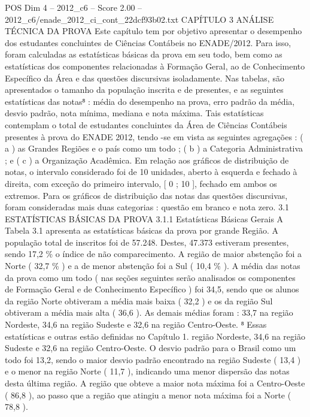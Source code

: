 \begin{textsample}{POS Dim 4 – 2012\_c6 – Score 2.00 – 2012\_c6/enade\_2012\_ci\_cont\_22dcf93b02.txt}  \label{ex:f4_pos_123}
CAPÍTULO 3 ANÁLISE TÉCNICA DA PROVA Este capítulo tem por objetivo apresentar o desempenho dos estudantes concluintes de Ciências Contábeis no ENADE/2012.
Para isso, foram calculadas as estatísticas básicas da prova em seu todo, bem como as estatísticas dos componentes relacionadas à Formação Geral, ao de Conhecimento Específico da Área e das questões discursivas isoladamente.
Nas tabelas, são apresentados o tamanho da população inscrita e de presentes, e as seguintes estatísticas das notas⁸ : média do desempenho na prova, erro padrão da média, desvio padrão, nota mínima, mediana e nota máxima.
Tais estatísticas contemplam o total de estudantes concluintes da Área de Ciências Contábeis presentes à prova do ENADE 2012, tendo -se em vista as seguintes agregações : ( a ) as Grandes Regiões e o país como um todo ; ( b ) a Categoria Administrativa ; e ( c ) a Organização Acadêmica.
Em relação aos gráficos de distribuição de notas, o intervalo considerado foi de 10 unidades, aberto à esquerda e fechado à direita, com exceção do primeiro intervalo, [ 0 ; 10 ], fechado em ambos os extremos.
Para os gráficos de distribuição das notas das questões discursivas, foram consideradas mais duas categorias : questão em branco e nota zero. 3.1 ESTATÍSTICAS BÁSICAS DA PROVA 3.1.1 Estatísticas Básicas Gerais A Tabela 3.1 apresenta as estatísticas básicas da prova por grande Região.
A população total de inscritos foi de 57.248.
Destes, 47.373 estiveram presentes, sendo 17,2 \% o índice de não comparecimento.
A região de maior abstenção foi a Norte ( 32,7 \% ) e a de menor abstenção foi a Sul ( 10,4 \% ).
A média das notas da prova como um todo ( nas seções seguintes serão analisados os componentes de Formação Geral e de Conhecimento Específico ) foi 34,5, sendo que os alunos da região Norte obtiveram a média mais baixa ( 32,2 ) e os da região Sul obtiveram a média mais alta ( 36,6 ).
As demais médias foram : 33,7 na região Nordeste, 34,6 na região Sudeste e 32,6 na região Centro-Oeste. ⁸ Essas estatísticas e outras estão definidas no Capítulo 1. região Nordeste, 34,6 na região Sudeste e 32,6 na região Centro-Oeste.
O desvio padrão para o Brasil como um todo foi 13,2, sendo o maior desvio padrão encontrado na região Sudeste ( 13,4 ) e o menor na região Norte ( 11,7 ), indicando uma menor dispersão das notas desta última região.
A região que obteve a maior nota máxima foi a Centro-Oeste ( 86,8 ), ao passo que a região que atingiu a menor nota máxima foi a Norte ( 78,8 ).

\end{textsample}
